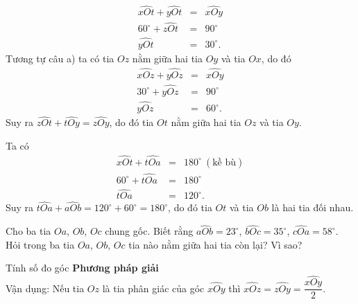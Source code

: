 \begin{vd}
{\begin{listEX}
\begin{eqnarray*}
	\widehat{xOt}+\widehat{yOt}&=&\widehat{xOy}\\
	60^{\circ}+\widehat{zOt}&=&90^{\circ}\\
	\widehat{yOt}&=&30^{\circ}.
\end{eqnarray*}
Tương tự câu a) ta có tia $ Oz $ nằm giữa hai tia $ Oy $ và tia $ Ox $, do đó
\begin{eqnarray*}
	\widehat{xOz}+\widehat{yOz}&=&\widehat{xOy}\\
	30^{\circ}+\widehat{yOz}&=&90^{\circ}\\
	\widehat{yOz}&=&60^{\circ}.
\end{eqnarray*}
Suy ra $ \widehat{zOt}+\widehat{tOy}=\widehat{zOy} $, do đó tia $ Ot $ nằm giữa hai tia $ Oz $ và tia $ Oy $.
\item Ta có
\begin{eqnarray*}
	\widehat{xOt}+\widehat{tOa}&=&180^{\circ}\ (\text{kề bù})\\
	60^{\circ}+\widehat{tOa}&=&180^{\circ}\\
	\widehat{tOa}&=&120^{\circ}.
\end{eqnarray*}
Suy ra $ \widehat{tOa}+\widehat{aOb}=120^{\circ}+60^{\circ}=180^{\circ} $, do đó tia $ Ot $ và tia $ Ob $ là hai tia đối nhau.
\end{listEX}
}
\end{vd}
\begin{vd}%
	Cho ba tia $ Oa $, $ Ob $, $ Oc $ chung gốc. Biết rằng $ \widehat{aOb}=23^{\circ} $, $ \widehat{bOc}=35^{\circ} $, $ \widehat{cOa}=58^{\circ} $. Hỏi trong ba tia $ Oa $, $ Ob $, $ Oc $ tia nào nằm giữa hai tia còn lại? Vì sao?
\end{vd}
\begin{dang}{Tính số đo góc}
	\textbf{Phương pháp giải}\\
	Vận dụng: Nếu tia $ Oz $ là tia phân giác của góc $ \widehat{xOy} $ thì $ \widehat{xOz}=\widehat{zOy}=\dfrac{\widehat{xOy}}{2} $.
\end{dang}
\setcounter{vd}{0}
